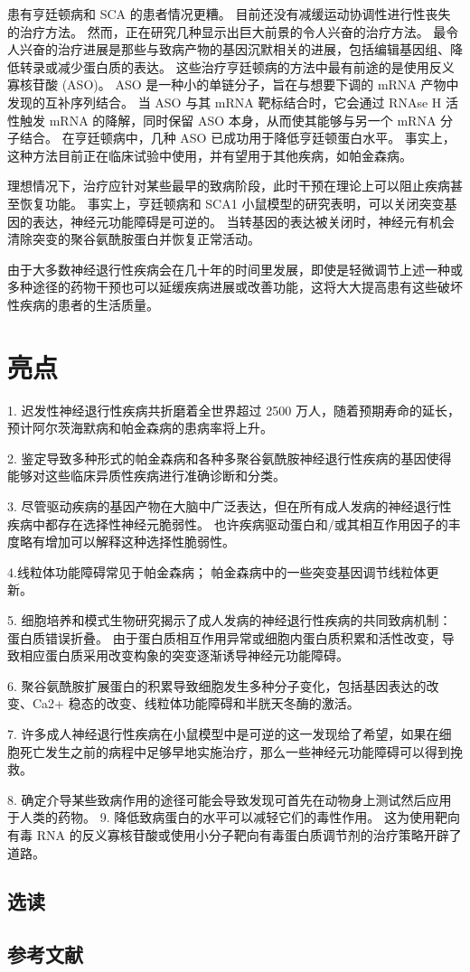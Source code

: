 患有亨廷顿病和 SCA 的患者情况更糟。 目前还没有减缓运动协调性进行性丧失的治疗方法。 然而，正在研究几种显示出巨大前景的令人兴奋的治疗方法。 最令人兴奋的治疗进展是那些与致病产物的基因沉默相关的进展，包括编辑基因组、降低转录或减少蛋白质的表达。 这些治疗亨廷顿病的方法中最有前途的是使用反义寡核苷酸 (ASO)。 ASO 是一种小的单链分子，旨在与想要下调的 mRNA 产物中发现的互补序列结合。 当 ASO 与其 mRNA 靶标结合时，它会通过 RNAse H 活性触发 mRNA 的降解，同时保留 ASO 本身，从而使其能够与另一个 mRNA 分子结合。 在亨廷顿病中，几种 ASO 已成功用于降低亨廷顿蛋白水平。 事实上，这种方法目前正在临床试验中使用，并有望用于其他疾病，如帕金森病。

理想情况下，治疗应针对某些最早的致病阶段，此时干预在理论上可以阻止疾病甚至恢复功能。 事实上，亨廷顿病和 SCA1 小鼠模型的研究表明，可以关闭突变基因的表达，神经元功能障碍是可逆的。 当转基因的表达被关闭时，神经元有机会清除突变的聚谷氨酰胺蛋白并恢复正常活动。

由于大多数神经退行性疾病会在几十年的时间里发展，即使是轻微调节上述一种或多种途径的药物干预也可以延缓疾病进展或改善功能，这将大大提高患有这些破坏性疾病的患者的生活质量。

\section{亮点}
1. 迟发性神经退行性疾病共折磨着全世界超过 2500 万人，随着预期寿命的延长，预计阿尔茨海默病和帕金森病的患病率将上升。 

2. 鉴定导致多种形式的帕金森病和各种多聚谷氨酰胺神经退行性疾病的基因使得能够对这些临床异质性疾病进行准确诊断和分类。 

3. 尽管驱动疾病的基因产物在大脑中广泛表达，但在所有成人发病的神经退行性疾病中都存在选择性神经元脆弱性。 也许疾病驱动蛋白和/或其相互作用因子的丰度略有增加可以解释这种选择性脆弱性。 

4.线粒体功能障碍常见于帕金森病； 帕金森病中的一些突变基因调节线粒体更新。 

5. 细胞培养和模式生物研究揭示了成人发病的神经退行性疾病的共同致病机制：蛋白质错误折叠。 由于蛋白质相互作用异常或细胞内蛋白质积累和活性改变，导致相应蛋白质采用改变构象的突变逐渐诱导神经元功能障碍。 

6. 聚谷氨酰胺扩展蛋白的积累导致细胞发生多种分子变化，包括基因表达的改变、Ca2+ 稳态的改变、线粒体功能障碍和半胱天冬酶的激活。 

7. 许多成人神经退行性疾病在小鼠模型中是可逆的这一发现给了希望，如果在细胞死亡发生之前的病程中足够早地实施治疗，那么一些神经元功能障碍可以得到挽救。 

8. 确定介导某些致病作用的途径可能会导致发现可首先在动物身上测试然后应用于人类的药物。 9. 降低致病蛋白的水平可以减轻它们的毒性作用。 这为使用靶向有毒 RNA 的反义寡核苷酸或使用小分子靶向有毒蛋白质调节剂的治疗策略开辟了道路。

\subsection{选读}
\subsection{参考文献}